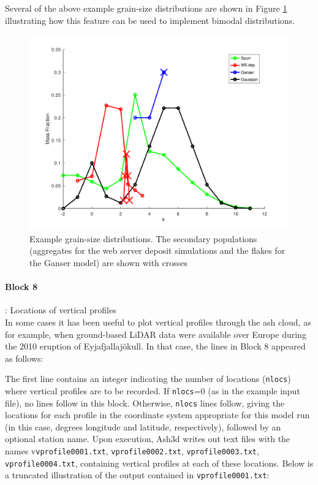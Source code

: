 Several of the above example grain-size distributions are shown in 
Figure \ref{FigInputGSD} 
illustrating how this feature can be used to implement bimodal distributions.
\begin{figure}[htbp]
\begin{center}
\includegraphics[angle=0,scale=0.7]{Figures/Scripts/InputGSD/FigInputGSD.pdf}
\parbox{15cm}{\caption{\label{FigInputGSD}
Example grain-size distributions. The secondary populations (aggregates for the web
server deposit simulations and the flakes for the Ganser model) are shown with
crosses}}
\end{center}
\end{figure}

\paragraph{Block 8}: Locations of vertical profiles\\
In some cases it has been useful to plot vertical profiles through the ash cloud, as for
example, when ground-based LiDAR data were available over Europe during the 2010
eruption of Eyjafjallaj\"okull. In that case, the lines in Block 8 appeared as follows:

The first line contains an integer indicating the number of locations
(\texttt{nlocs}) where
vertical profiles are to be recorded. If \texttt{nlocs}=0 (as in the example input file), no
lines follow in this block. Otherwise, \texttt{nlocs} lines follow, giving the locations for
each profile in the coordinate system appropriate for this model run (in this case,
degrees longitude and latitude, respectively), followed by an optional station name.
Upon execution, Ash3d writes out text files with the names v\texttt{vprofile0001.txt},
\texttt{vprofile0002.txt}, \texttt{vprofile0003.txt}, \texttt{vprofile0004.txt},
containing vertical profiles at each
of these locations. Below is a truncated illustration of the output contained in
\texttt{vprofile0001.txt}:

